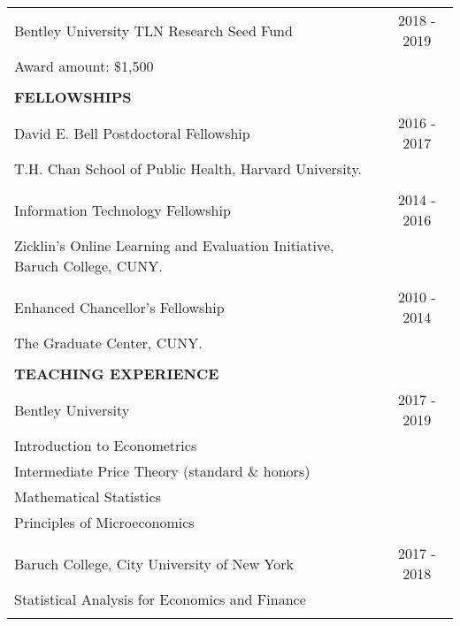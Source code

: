 \documentclass[12 pt]{article}
\begin{document}
\begin{longtable}{ccccc}
 \multicolumn{4}{l}{Bentley University TLN Research Seed Fund} & \multicolumn{1}{c}{2018 - 2019} \\
\multicolumn{4}{l}{Award amount: \$1,500}  \\
\\



 \multicolumn{5}{l}{\textbf{FELLOWSHIPS}}\\[2 pt] 

 \multicolumn{4}{l}{David E. Bell Postdoctoral Fellowship} & \multicolumn{1}{c}{2016 - 2017} \\
\multicolumn{4}{l}{T.H. Chan School of Public Health, Harvard University.}   \\
\\
 \multicolumn{4}{l}{Information Technology Fellowship} & \multicolumn{1}{c}{2014 - 2016} \\
\multicolumn{4}{l}{Zicklin's Online Learning and Evaluation Initiative, Baruch College, CUNY.}   \\
\\
 \multicolumn{4}{l}{Enhanced Chancellor's Fellowship} & \multicolumn{1}{c}{2010 - 2014} \\
\multicolumn{4}{l}{The Graduate Center, CUNY.}   \\

\\


 \multicolumn{5}{l}{\textbf{TEACHING EXPERIENCE}}\\[2 pt] 
\multicolumn{4}{l}{Bentley University}  & \multicolumn{1}{c}{2017 - 2019} \\
 \multicolumn{4}{l}{Introduction to Econometrics}      \\
  \multicolumn{4}{l}{Intermediate Price Theory (standard \& honors)}    \\
 \multicolumn{4}{l}{Mathematical Statistics}      \\
\multicolumn{4}{l}{Principles of Microeconomics} \\

\\

\multicolumn{4}{l}{Baruch College, City University of New York}     & \multicolumn{1}{c}{2017 - 2018}     \\


\multicolumn{4}{l}{Statistical Analysis for Economics and Finance}        \\


\\


\end{longtable}
\end{document}
